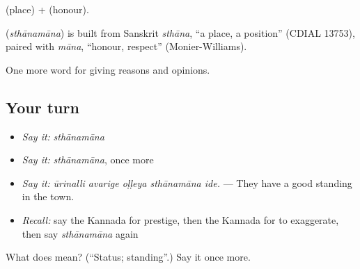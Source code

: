  (place) +  (honour).

\begin{cousinweb}
\textbf{} (\emph{sthānamāna}) is built from Sanskrit \emph{sthāna}, \textquotedblleft{}a place, a position\textquotedblright{} (CDIAL 13753), paired with \emph{māna}, \textquotedblleft{}honour, respect\textquotedblright{} (Monier-Williams).
\end{cousinweb}

\begin{grammarlens}[title={What you've built}]
One more word for giving reasons and opinions.
\end{grammarlens}

\subsection*{Your turn}
\begin{itemize}
\raggedright
  \item \emph{Say it:} \emph{sthānamāna}
  \item \emph{Say it:} \emph{sthānamāna}, once more
  \item \emph{Say it:} \emph{ūrinalli avarige oḷḷeya sthānamāna ide.} — They have a good standing in the town.
  \item \emph{Recall:} say the Kannada for prestige, then the Kannada for to exaggerate, then say \emph{sthānamāna} again
\end{itemize}

\begin{tcolorbox}[breakable,colback=teal!4,colframe=teal!35!black,title={Before you move on}]
What does  mean? (\textquotedblleft{}Status; standing\textquotedblright{}.) Say it once more.
\end{tcolorbox}
